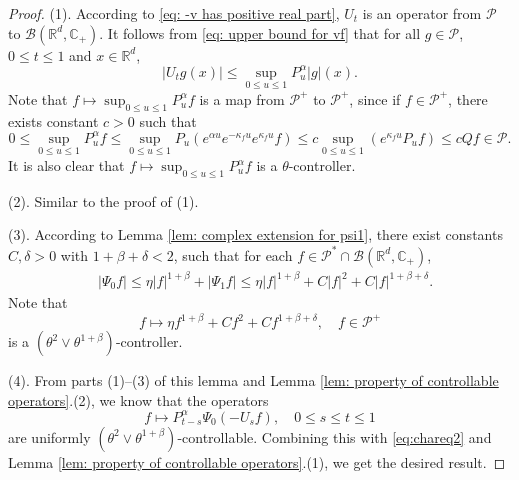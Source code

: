 \documentclass[12pt,a4paper]{amsart}
\theoremstyle{plain}
\theoremstyle{definition}
\numberwithin{equation}{section}
\begin{document}
\begin{proof}
    (1). According to \eqref{eq: -v has positive real part}, $U_t$ is an operator from $\mathcal P$ to $\mathcal B(\mathbb R^d, \mathbb C_+)$.
    It follows from \eqref{eq: upper bound for vf} that for all $g\in \mathcal P$, $0\leq t\leq 1$ and $x\in \mathbb R^d$,
\[
    |U_t g(x)|
    \leq \sup_{0\leq u\leq 1}P_u^\alpha |g| (x).
\]
    Note that $f\mapsto\sup_{0\leq u\leq 1}P^{\alpha}_u f$ is a map from $\mathcal P^+$ to $\mathcal P^+$, since if $f\in \mathcal P^+$, there exists constant $c>0$ such that
\[
	0
	\leq \sup_{0\leq u\leq 1}P^{\alpha}_u f
	\leq \sup_{0\leq u\leq 1} P_u (e^{\alpha u} e^{-\kappa_f u} e^{\kappa_f u} f )
	\leq c \sup_{0\leq u\leq 1} (e^{\kappa_fu}P_u f) \leq c Qf \in \mathcal P.
\]
	It is also clear that $f\mapsto\sup_{0\leq u\leq 1}P^{\alpha}_u f$ is a $\theta$-controller.


    (2). Similar to the proof of (1).

    (3). 
    According to Lemma \ref{lem: complex extension for psi1}, there exist constants $C, \delta >0$ with $1+\beta+\delta< 2$, such that for each $f\in \mathcal P^* \cap \mathcal B(\mathbb R^d, \mathbb C_+)$,
\begin{equation}\begin{split}
    &|\Psi_0 f|
    \leq \eta |f|^{1+\beta} + |\Psi_1 f|
    \leq \eta |f|^{1+\beta} + C|f|^2+ C |f|^{1+\beta + \delta}.
\end{split}\end{equation}
    Note that
\[
    f \mapsto \eta f^{1+\beta} + Cf^2+ Cf^{1+\beta + \delta},\quad f\in \mathcal P^+
\]
    is a $(\theta^2 \vee \theta^{1+\beta})$-controller.

    (4). From parts (1)--(3) of this lemma and Lemma \ref{lem: property of controllable operators}.(2), we know that the operators
\[
    f
    \mapsto P^\alpha_{t-s}\Psi_0(-U_sf),
    \quad 0\leq s\leq t\leq 1
\]
    are uniformly $(\theta^2\vee \theta^{1+\beta})$-controllable.
    Combining this with \eqref{eq:chareq2} and Lemma \ref{lem: property of controllable operators}.(1), we get the desired result.


\end{proof}
\end{document}
